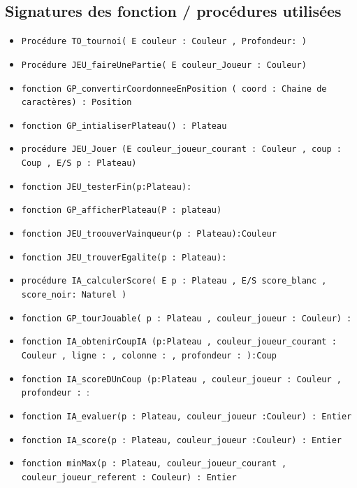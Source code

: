 \documentclass{report}
\begin{document}
        \subsection{ Signatures des fonction / procédures utilisées }
        \begin{itemize}
         \item {\tt Procédure TO\_tournoi( E couleur : Couleur , Profondeur: \naturel )}
         \item{\tt Procédure JEU\_faireUnePartie( E couleur\_Joueur : Couleur)}
         \item{ \tt fonction GP\_convertirCoordonneeEnPosition ( coord : Chaine de caractères) : Position}
         \item{\tt fonction GP\_intialiserPlateau() : Plateau }
         \item{\tt procédure JEU\_Jouer (E couleur\_joueur\_courant : Couleur  , coup : Coup , E/S p : Plateau) }
         \item{\tt fonction JEU\_testerFin(p:Plateau):\booleen }
         \item{\tt  fonction GP\_afficherPlateau(P : plateau)}
         \item{\tt  fonction JEU\_troouverVainqueur(p : Plateau):Couleur}
         \item{\tt fonction JEU\_trouverEgalite(p : Plateau): \booleen}
         \item{\tt  procédure IA\_calculerScore( E p : Plateau , E/S score\_blanc , score\_noir: Naturel )}
         \item{ \tt fonction GP\_tourJouable( p : Plateau , couleur\_joueur : Couleur) : \booleen}
         \item{\tt  fonction IA\_obtenirCoupIA (p:Plateau , couleur\_joueur\_courant : Couleur , ligne : \naturel, colonne : \naturel , profondeur : \naturel ):Coup}
         \item{\tt fonction IA\_scoreDUnCoup (p:Plateau , couleur\_joueur : Couleur , profondeur : \naturel}:\naturel
          
           \item {\tt fonction IA\_evaluer(p : Plateau, couleur\_joueur :Couleur) : Entier}
           \item {\tt fonction IA\_score(p : Plateau, couleur\_joueur :Couleur) : Entier}
           \item {\tt fonction minMax(p : Plateau, couleur\_joueur\_courant , couleur\_joueur\_referent : Couleur) : Entier}
           

\end{itemize}
\end{document}
